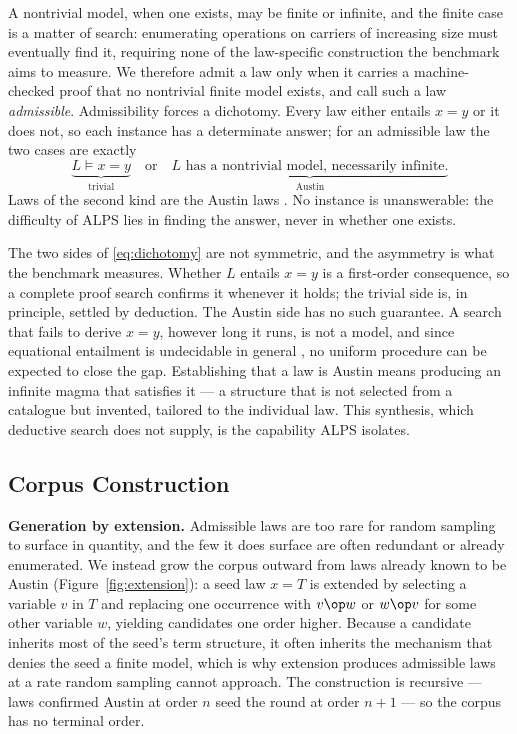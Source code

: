 A nontrivial model, when one exists, may be finite or infinite, and the finite
case is a matter of search: enumerating operations on carriers of increasing
size must eventually find it, requiring none of the law-specific construction
the benchmark aims to measure. We therefore admit a law only when it carries a
machine-checked proof that no nontrivial finite model exists, and call such a
law \emph{admissible}. Admissibility forces a dichotomy. Every law either
entails $x = y$ or it does not, so each instance has a determinate answer; for
an admissible law the two cases are exactly
\begin{equation}
\label{eq:dichotomy}
\underbrace{L \models x = y}_{\text{trivial}}
\quad\text{or}\quad
\underbrace{L \text{ has a nontrivial model, necessarily infinite.}}_{\text{Austin}}
\end{equation}
Laws of the second kind are the Austin laws \citep{kisielewicz1997austin}. No
instance is unanswerable: the difficulty of ALPS lies in finding the answer,
never in whether one exists.

The two sides of \eqref{eq:dichotomy} are not symmetric, and the asymmetry is
what the benchmark measures. Whether $L$ entails $x = y$ is a first-order
consequence, so a complete proof search confirms it whenever it holds; the
trivial side is, in principle, settled by deduction. The Austin side has no
such guarantee. A search that fails to derive $x = y$, however long it runs,
is not a model, and since equational entailment is undecidable in general
\citep{baader1998term}, no uniform procedure can be expected to close the gap.
Establishing that a law is Austin means producing an infinite magma that
satisfies it — a structure that is not selected from a catalogue but invented,
tailored to the individual law. This synthesis, which deductive search does
not supply, is the capability ALPS isolates.

\subsection{Corpus Construction}

\textbf{Generation by extension.} Admissible laws are too rare for random
sampling to surface in quantity, and the few it does surface are often
redundant or already enumerated. We instead grow the corpus outward from laws
already known to be Austin (Figure~\ref{fig:extension}): a seed law $x = T$ is
extended by selecting a variable $v$ in $T$ and replacing one occurrence with
$v \op w$ or $w \op v$ for some other variable $w$, yielding candidates one
order higher. Because a candidate inherits most of the seed's term structure,
it often inherits the mechanism that denies the seed a finite model, which is
why extension produces admissible laws at a rate random sampling cannot
approach. The construction is recursive — laws confirmed Austin at order $n$
seed the round at order $n{+}1$ — so the corpus has no terminal order.

